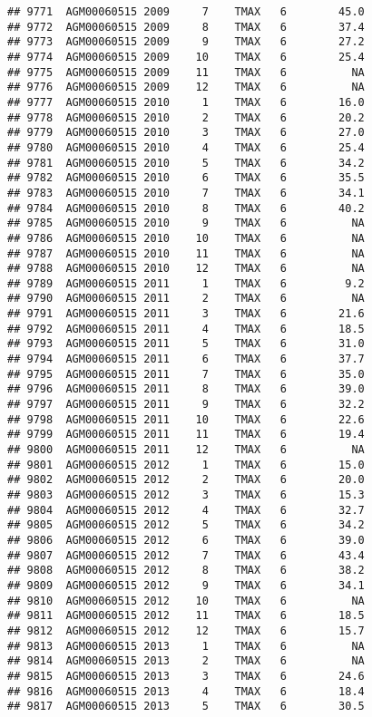 \documentclass{article}\usepackage[]{graphicx}\usepackage[]{color}
\makeatletter
\newenvironment{kframe}{%
 \def\at@end@of@kframe{}%
 \ifinner\ifhmode%
  \def\at@end@of@kframe{\end{minipage}}%
  \begin{minipage}{\columnwidth}%
 \fi\fi%
 \def\FrameCommand##1{\hskip\@totalleftmargin \hskip-\fboxsep
 \colorbox{shadecolor}{##1}\hskip-\fboxsep
     \hskip-\linewidth \hskip-\@totalleftmargin \hskip\columnwidth}%
 \MakeFramed {\advance\hsize-\width
   \@totalleftmargin\z@ \linewidth\hsize
   \@setminipage}}%
 {\par\unskip\endMakeFramed%
 \at@end@of@kframe}
\newenvironment{knitrout}{}{} %
\makeatother
\begin{document}
\begin{knitrout}
\begin{kframe}
\begin{verbatim}
## 9771  AGM00060515 2009     7    TMAX   6        45.0
## 9772  AGM00060515 2009     8    TMAX   6        37.4
## 9773  AGM00060515 2009     9    TMAX   6        27.2
## 9774  AGM00060515 2009    10    TMAX   6        25.4
## 9775  AGM00060515 2009    11    TMAX   6          NA
## 9776  AGM00060515 2009    12    TMAX   6          NA
## 9777  AGM00060515 2010     1    TMAX   6        16.0
## 9778  AGM00060515 2010     2    TMAX   6        20.2
## 9779  AGM00060515 2010     3    TMAX   6        27.0
## 9780  AGM00060515 2010     4    TMAX   6        25.4
## 9781  AGM00060515 2010     5    TMAX   6        34.2
## 9782  AGM00060515 2010     6    TMAX   6        35.5
## 9783  AGM00060515 2010     7    TMAX   6        34.1
## 9784  AGM00060515 2010     8    TMAX   6        40.2
## 9785  AGM00060515 2010     9    TMAX   6          NA
## 9786  AGM00060515 2010    10    TMAX   6          NA
## 9787  AGM00060515 2010    11    TMAX   6          NA
## 9788  AGM00060515 2010    12    TMAX   6          NA
## 9789  AGM00060515 2011     1    TMAX   6         9.2
## 9790  AGM00060515 2011     2    TMAX   6          NA
## 9791  AGM00060515 2011     3    TMAX   6        21.6
## 9792  AGM00060515 2011     4    TMAX   6        18.5
## 9793  AGM00060515 2011     5    TMAX   6        31.0
## 9794  AGM00060515 2011     6    TMAX   6        37.7
## 9795  AGM00060515 2011     7    TMAX   6        35.0
## 9796  AGM00060515 2011     8    TMAX   6        39.0
## 9797  AGM00060515 2011     9    TMAX   6        32.2
## 9798  AGM00060515 2011    10    TMAX   6        22.6
## 9799  AGM00060515 2011    11    TMAX   6        19.4
## 9800  AGM00060515 2011    12    TMAX   6          NA
## 9801  AGM00060515 2012     1    TMAX   6        15.0
## 9802  AGM00060515 2012     2    TMAX   6        20.0
## 9803  AGM00060515 2012     3    TMAX   6        15.3
## 9804  AGM00060515 2012     4    TMAX   6        32.7
## 9805  AGM00060515 2012     5    TMAX   6        34.2
## 9806  AGM00060515 2012     6    TMAX   6        39.0
## 9807  AGM00060515 2012     7    TMAX   6        43.4
## 9808  AGM00060515 2012     8    TMAX   6        38.2
## 9809  AGM00060515 2012     9    TMAX   6        34.1
## 9810  AGM00060515 2012    10    TMAX   6          NA
## 9811  AGM00060515 2012    11    TMAX   6        18.5
## 9812  AGM00060515 2012    12    TMAX   6        15.7
## 9813  AGM00060515 2013     1    TMAX   6          NA
## 9814  AGM00060515 2013     2    TMAX   6          NA
## 9815  AGM00060515 2013     3    TMAX   6        24.6
## 9816  AGM00060515 2013     4    TMAX   6        18.4
## 9817  AGM00060515 2013     5    TMAX   6        30.5

\end{verbatim}
\end{kframe}
\end{knitrout}
\end{document}
